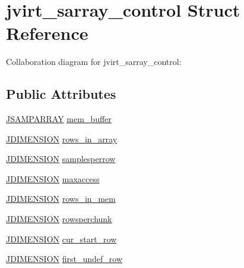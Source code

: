 \hypertarget{structjvirt__sarray__control}{}\section{jvirt\+\_\+sarray\+\_\+control Struct Reference}
\label{structjvirt__sarray__control}


Collaboration diagram for jvirt\+\_\+sarray\+\_\+control\+:
\subsection*{Public Attributes}
\begin{DoxyCompactItemize}
\item 
\mbox{\hyperlink{jpeglib_8h_ac9d5d1b829ed51769db69a37271a7e91}{J\+S\+A\+M\+P\+A\+R\+R\+AY}} \mbox{\hyperlink{structjvirt__sarray__control_abc1f86c02141d80dc5d443e57a1d36d6}{mem\+\_\+buffer}}
\item 
\mbox{\hyperlink{jmorecfg_8h_a04ed4674f6f1d0d50ec241531e38274f}{J\+D\+I\+M\+E\+N\+S\+I\+ON}} \mbox{\hyperlink{structjvirt__sarray__control_a17d42465a9cedfd4feeb93edfd8d134a}{rows\+\_\+in\+\_\+array}}
\item 
\mbox{\hyperlink{jmorecfg_8h_a04ed4674f6f1d0d50ec241531e38274f}{J\+D\+I\+M\+E\+N\+S\+I\+ON}} \mbox{\hyperlink{structjvirt__sarray__control_a3b6c756c3a71dc8023672093a60cc4f1}{samplesperrow}}
\item 
\mbox{\hyperlink{jmorecfg_8h_a04ed4674f6f1d0d50ec241531e38274f}{J\+D\+I\+M\+E\+N\+S\+I\+ON}} \mbox{\hyperlink{structjvirt__sarray__control_a719350d4faf724c6617a5892aae8ec2a}{maxaccess}}
\item 
\mbox{\hyperlink{jmorecfg_8h_a04ed4674f6f1d0d50ec241531e38274f}{J\+D\+I\+M\+E\+N\+S\+I\+ON}} \mbox{\hyperlink{structjvirt__sarray__control_aac15348d4b307c8aacc631b96aa3b547}{rows\+\_\+in\+\_\+mem}}
\item 
\mbox{\hyperlink{jmorecfg_8h_a04ed4674f6f1d0d50ec241531e38274f}{J\+D\+I\+M\+E\+N\+S\+I\+ON}} \mbox{\hyperlink{structjvirt__sarray__control_ad1c55661955e1600d447ad754c6aece1}{rowsperchunk}}
\item 
\mbox{\hyperlink{jmorecfg_8h_a04ed4674f6f1d0d50ec241531e38274f}{J\+D\+I\+M\+E\+N\+S\+I\+ON}} \mbox{\hyperlink{structjvirt__sarray__control_a84ae28e5bf362228d7f43b486239e873}{cur\+\_\+start\+\_\+row}}
\item 
\mbox{\hyperlink{jmorecfg_8h_a04ed4674f6f1d0d50ec241531e38274f}{J\+D\+I\+M\+E\+N\+S\+I\+ON}} \mbox{\hyperlink{structjvirt__sarray__control_a049e8066e21d2fca662be25e4365259a}{first\+\_\+undef\+\_\+row}}

\end{DoxyCompactItemize}
